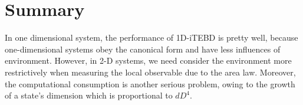 \chapter{Summary}
\label{chapter:summary}
In one dimensional system, the performance of 1D-iTEBD is pretty well, because one-dimensional systems obey the canonical form and have less influences of environment. However, in 2-D systems, we need consider the environment more restrictively when measuring the local observable due to the area law. Moreover, the computational consumption is another serious problem, owing to the growth of a state's dimension which is proportional to $dD^4$.

